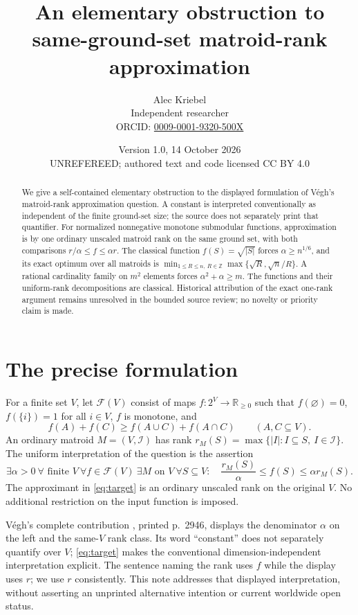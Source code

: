 \documentclass[11pt]{article}
\title{An elementary obstruction to same-ground-set matroid-rank approximation}
\author{Alec Kriebel\\Independent researcher\\\small ORCID: \href{https://orcid.org/0009-0001-9320-500X}{0009-0001-9320-500X}}
\date{Version 1.0, 14 October 2026\\\small UNREFEREED; authored text and code licensed CC BY 4.0}
\newcommand{\emptysetv}{\varnothing}
\begin{document}
\maketitle
\begin{abstract}
We give a self-contained elementary obstruction to the displayed formulation of V\'egh's matroid-rank approximation question. A constant is interpreted conventionally as independent of the finite ground-set size; the source does not separately print that quantifier. For normalized nonnegative monotone submodular functions, approximation is by one ordinary unscaled matroid rank on the same ground set, with both comparisons $r/\alpha\le f\le\alpha r$. The classical function $f(S)=\sqrt{|S|}$ forces $\alpha\ge n^{1/6}$, and its exact optimum over all matroids is $\min_{1\le R\le n,\ R\in\mathbb Z}\max\{\sqrt R,\sqrt n/R\}$. A rational cardinality family on $m^2$ elements forces $\alpha^2+\alpha\ge m$. The functions and their uniform-rank decompositions are classical. Historical attribution of the exact one-rank argument remains unresolved in the bounded source review; no novelty or priority claim is made.
\end{abstract}

\section{The precise formulation}
For a finite set $V$, let $\mathcal F(V)$ consist of maps $f:2^V\to\mathbb R_{\ge0}$ such that $f(\emptysetv)=0$, $f(\{i\})=1$ for all $i\in V$, $f$ is monotone, and
\[
 f(A)+f(C)\ge f(A\cup C)+f(A\cap C)\qquad(A,C\subseteq V).
\]
An ordinary matroid $M=(V,\mathcal I)$ has rank
$r_M(S)=\max\{|I|:I\subseteq S,\ I\in\mathcal I\}$.
The uniform interpretation of the question is the assertion
\begin{equation}\label{eq:target}
 \exists\alpha>0\ \forall\text{ finite }V\ \forall f\in\mathcal F(V)\
 \exists M\text{ on }V\ \forall S\subseteq V:\quad
 \frac{r_M(S)}\alpha\le f(S)\le\alpha r_M(S).
\end{equation}
The approximant in \eqref{eq:target} is an ordinary unscaled rank on the original $V$. No additional restriction on the input function is imposed.

V\'egh's complete contribution \cite{vegh}, printed p.~2946, displays the denominator $\alpha$ on the left and the same-$V$ rank class. Its word ``constant'' does not separately quantify over $V$; \eqref{eq:target} makes the conventional dimension-independent interpretation explicit. The sentence naming the rank uses $f$ while the display uses $r$; we use $r$ consistently. This note addresses that displayed interpretation, without asserting an unprinted alternative intention or current worldwide open status.
\end{document}
